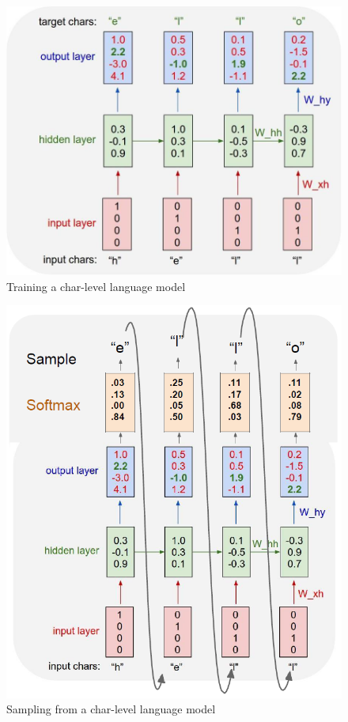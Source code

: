 \begin{minipage}{.5\linewidth}
    \begin{figure}[H]
        \centering
        \includegraphics[width=0.8\linewidth]{images/seq-language1}
        \caption[Training a char-level language model]{Training a char-level language model}
        \label{fig:seq-language1}
    \end{figure}
\end{minipage}
\begin{minipage}{.5\linewidth}
    \begin{figure}[H]
        \centering
        \includegraphics[width=0.7\linewidth]{images/seq-language2}
        \caption[Sampling from a char-level language model]{Sampling from a char-level language model}
        \label{fig:seq-language2}
    \end{figure}
\end{minipage}


